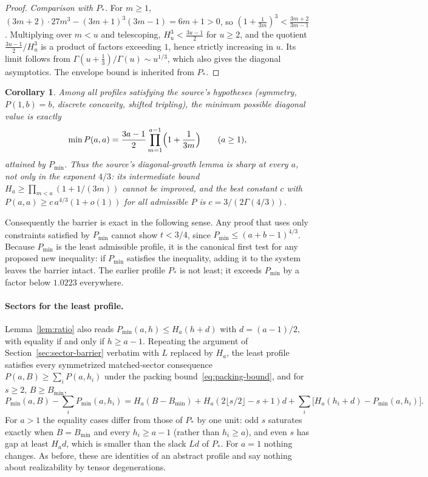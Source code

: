 \documentclass[11pt]{article}
\newtheorem{corollary}{Corollary}
\begin{document}
\begin{proof}
\emph{Comparison with $P_*$.} For $m\ge1$,
$(3m+2)\cdot27m^3-(3m+1)^3(3m-1)=6m+1>0$, so
$(1+\frac1{3m})^3<\frac{3m+2}{3m-1}$. Multiplying over $m<u$ and
telescoping, $H_u^3<\frac{3u-1}2$ for $u\ge2$, and the quotient
$\frac{3u-1}{2}/H_u^3$ is a product of factors exceeding $1$, hence
strictly increasing in $u$. Its limit follows from
$\Gamma(u+\tfrac13)/\Gamma(u)\sim u^{1/3}$, which also gives the
diagonal asymptotics. The envelope bound is inherited from $P_*$.
\end{proof}

\begin{corollary}\label{cor:sharp}
Among all profiles satisfying the source's hypotheses (symmetry,
$P(1,b)=b$, discrete concavity, shifted tripling), the minimum possible
diagonal value is exactly
\[
 \min P(a,a)=\frac{3a-1}{2}\prod_{m=1}^{a-1}\Bigl(1+\frac1{3m}\Bigr)
 \qquad(a\ge1),
\]
attained by $P_{\min}$. Thus the source's diagonal-growth lemma is sharp
at every $a$, not only in the exponent $4/3$: its intermediate bound
$H_a\ge\prod_{m<a}(1+1/(3m))$ cannot be improved, and the best constant
$c$ with $P(a,a)\ge c\,a^{4/3}(1+o(1))$ for all admissible $P$ is
$c=3/(2\Gamma(4/3))$.
\end{corollary}

Consequently the barrier is exact in the following sense. Any proof
that uses only constraints satisfied by $P_{\min}$ cannot show $t<3/4$,
since $P_{\min}\le(a+b-1)^{4/3}$. Because $P_{\min}$ is the least
admissible profile, it is the canonical first test for any proposed new
inequality: if $P_{\min}$ satisfies the inequality, adding it to the
system leaves the barrier intact. The earlier profile $P_*$ is not
least; it exceeds $P_{\min}$ by a factor below $1.0223$ everywhere.

\paragraph{Sectors for the least profile.}
Lemma~\ref{lem:ratio} also reads
$P_{\min}(a,h)\le H_a(h+d)$ with $d=(a-1)/2$, with equality if and only
if $h\ge a-1$. Repeating the argument of
Section~\ref{sec:sector-barrier} verbatim with $L$ replaced by $H_a$,
the least profile satisfies every symmetrized matched-sector
consequence $P(a,B)\ge\sum_iP(a,h_i)$ under the packing
bound~\eqref{eq:packing-bound}, and for $s\ge2$, $B\ge B_{\min}$,
\[
 P_{\min}(a,B)-\sum_iP_{\min}(a,h_i)
 =H_a(B-B_{\min})+H_a(2\lfloor s/2\rfloor-s+1)d
  +\sum_i\bigl[H_a(h_i+d)-P_{\min}(a,h_i)\bigr].
\]
For $a>1$ the equality cases differ from those of $P_*$ by one unit:
odd $s$ saturates exactly when $B=B_{\min}$ and every $h_i\ge a-1$
(rather than $h_i\ge a$), and even $s$ has gap at least $H_ad$, which
is smaller than the slack $Ld$ of $P_*$. For $a=1$ nothing changes.
As before, these are identities of an abstract profile and say nothing
about realizability by tensor degenerations.
\end{document}
